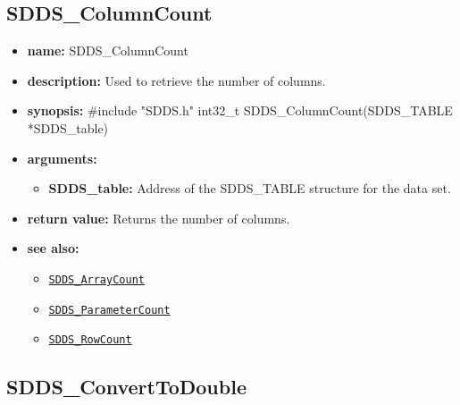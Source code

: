 \documentclass[11pt]{article}
\newcommand{\progref}[1]{\hyperref[SDDS_#1]{\tt SDDS\_#1}}
\begin{document}
\subsection{SDDS\_ColumnCount}
\label{SDDS_ColumnCount}

\begin{itemize}
\item {\bf name:}\newline
SDDS\_ColumnCount
\item {\bf description:}\newline
Used to retrieve the number of columns.
\item {\bf synopsis:} \#include "SDDS.h"\newline
int32\_t SDDS\_ColumnCount(SDDS\_TABLE *SDDS\_table)
\item {\bf arguments:}
\begin{itemize}
\item {\bf SDDS\_table:} Address of the SDDS\_TABLE structure for the data set.
\end{itemize}
\item {\bf return value:}\newline
Returns the number of columns.
\item {\bf see also:}
\begin{itemize}
\item \progref{ArrayCount}
\item \progref{ParameterCount}
\item \progref{RowCount}
\end{itemize}
\end{itemize}

\subsection{SDDS\_ConvertToDouble}
\label{SDDS_ConvertToDouble}
\end{document}
